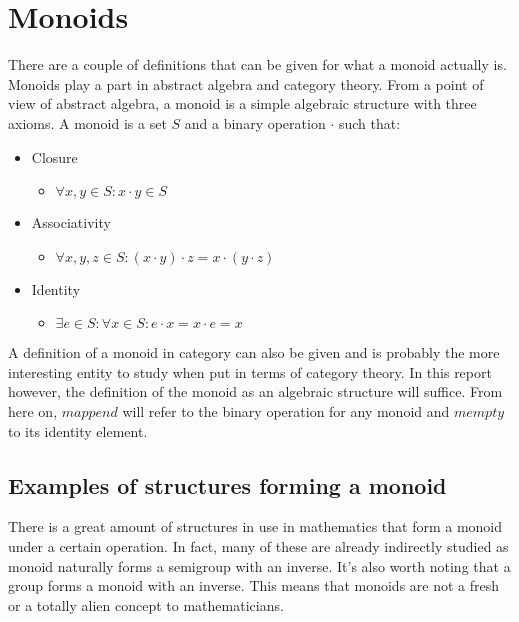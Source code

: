 \documentclass{acm_proc_article-sp}
\begin{document}
\section{Monoids}
There are a couple of definitions that can be given for what a monoid
actually is. Monoids play a part in abstract algebra and category
theory. From a point of view of abstract algebra, a monoid is a simple
algebraic structure with three axioms. A monoid is a set $S$ and a
binary operation $\cdot$ such that:
\begin{itemize}
\item Closure
  \begin{itemize}
  \item $\forall x,y \in S: x \cdot y \in S$
  \end{itemize}
\item Associativity
  \begin{itemize}
  \item $\forall x,y,z \in S: (x \cdot y) \cdot z = x \cdot (y
    \cdot z)$
  \end{itemize}
\item Identity
  \begin{itemize}
  \item $\exists e \in S: \forall x \in S: e \cdot x = x \cdot e
    = x$
  \end{itemize}
\end{itemize}
A definition of a monoid in category can also be given and is
probably the more interesting entity to study when put in terms of
category theory. In this report however, the definition of the monoid
as an algebraic structure will suffice. From here on, $mappend$ will
refer to the binary operation for any monoid and $mempty$ to its
identity element.
\subsection{Examples of structures forming a monoid}
There is a great amount of structures in use in mathematics that form
a monoid under a certain operation. In fact, many of these are already
indirectly studied as monoid naturally forms a semigroup with an
inverse. It's also worth noting that a group forms a monoid with an
inverse. This means that monoids are not a fresh or a totally alien
concept to mathematicians.
\end{document}
